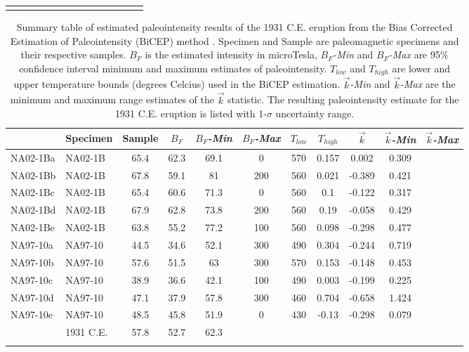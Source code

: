 \documentclass[draft]{agujournal2019}
\begin{document}
\begin{landscape}
\begin{longtable}{llcccccccccccc}
\hline
\label{tab:specimens}
\end{longtable}
\end{landscape}

 

\begin{landscape}
\footnotesize
{}\textwidth
\begin{longtable}{llcccccccc}
\caption{Summary table of estimated paleointensity results of the 1931 C.E. eruption from the Bias Corrected Estimation of Paleointensity (BiCEP) method \cite{Cych2021a}. Specimen and Sample are paleomagnetic specimens and their respective samples. $B_{F}$ is the estimated intensity in microTesla, $B_{F}$\textit{-Min} and $B_{F}$\textit{-Max} are 95$\%$ confidence interval minimum and maximum estimates of paleointensity. $T_{low}$ and $T_{high}$ are lower and upper temperature bounds (degrees Celcius) used in the BiCEP estimation. $\vec{k}$\textit{-Min} and $\vec{k}$\textit{-Max} are the minimum and maximum range estimates of the $\vec{k}$ statistic. The resulting paleointensity estimate for the 1931 C.E. eruption is listed with 1-$\sigma$ uncertainty range.}\\

\hline
&Specimen &	Sample	&	$B_{F}$	&	$B_{F}$\textit{-Min}	&	$B_{F}$\textit{-Max}	&	$T_{low}$	&	$T_{high}$	&	$\vec{k}$	&	$\vec{k}$\textit{-Min}	&	$\vec{k}$\textit{-Max}	\\					
\hline																								
NA02-1Ba	&	NA02-1B	&	65.4	&	62.3	&	69.1	&	0	&	570	&	0.157	&	0.002	&	0.309	\\					
NA02-1Bb	&	NA02-1B	&	67.8	&	59.1	&	81	&	200	&	560	&	0.021	&	-0.389	&	0.421	\\					
NA02-1Bc	&	NA02-1B	&	65.4	&	60.6	&	71.3	&	0	&	560	&	0.1	&	-0.122	&	0.317	\\					
NA02-1Bd	&	NA02-1B	&	67.9	&	62.8	&	73.8	&	200	&	560	&	0.19	&	-0.058	&	0.429	\\					
NA02-1Be	&	NA02-1B	&	63.8	&	55.2	&	77.2	&	100	&	560	&	0.098	&	-0.298	&	0.477	\\					
NA97-10a	&	NA97-10	&	44.5	&	34.6	&	52.1	&	300	&	490	&	0.304	&	-0.244	&	0.719	\\					
NA97-10b	&	NA97-10	&	57.6	&	51.5	&	63	&	300	&	570	&	0.153	&	-0.148	&	0.453	\\					
NA97-10c	&	NA97-10	&	38.9	&	36.6	&	42.1	&	100	&	490	&	0.003	&	-0.199	&	0.225	\\					
NA97-10d	&	NA97-10	&	47.1	&	37.9	&	57.8	&	300	&	460	&	0.704	&	-0.658	&	1.424	\\					
NA97-10e	&	NA97-10	&	48.5	&	45.8	&	51.9	&	0	&	430	&	-0.13	&	-0.298	&	0.079	\\					
\hline																								
	&	1931 C.E.	&	57.8	&	52.7	&	62.3	&		&		&		&		&		\\					
\hline																	
\label{tab:bicep}
\end{longtable}
\end{landscape}																								
\end{document}
